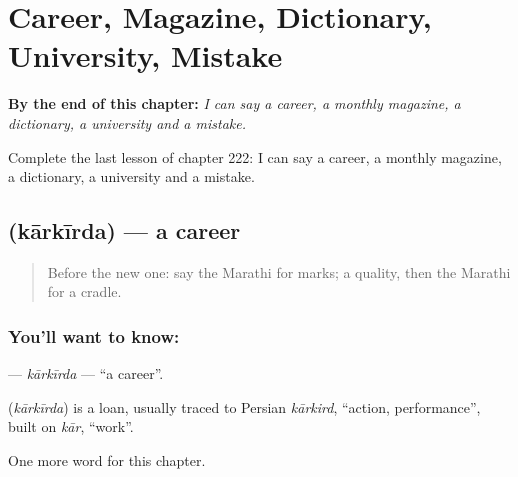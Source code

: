 
\chapter{Career, Magazine, Dictionary, University, Mistake}
\label{ch:mr-career-monthly-magazine-dictionary-university-mistake}

\begin{chapteropening}
\textbf{By the end of this chapter:} \emph{I can say a career, a monthly magazine, a dictionary, a university and a mistake.}

Complete the last lesson of chapter 222: I can say a career, a monthly magazine, a dictionary, a university and a mistake.
\end{chapteropening}

\section[\texorpdfstring{\mr{कारकीर्द} (kārkīrda)}{कारकीर्द (kārkīrda)}]{ (kārkīrda) — a career}

\label{lesson:MR-C222-karkirda}



\begin{quote}
Before the new one: say the Marathi for marks; a quality, then the Marathi for a cradle.
\end{quote}

\subsection*{You'll want to know: }
\textbf{} — \emph{kārkīrda} — \textquotedblleft{}a career\textquotedblright{}.

\begin{cousinweb}
\textbf{} (\emph{kārkīrda}) is a loan, usually traced to Persian \emph{kārkird}, \textquotedblleft{}action, performance\textquotedblright{}, built on \emph{kār}, \textquotedblleft{}work\textquotedblright{}.
\end{cousinweb}

\begin{grammarlens}[title={What you've built}]
One more word for this chapter.
\end{grammarlens}

